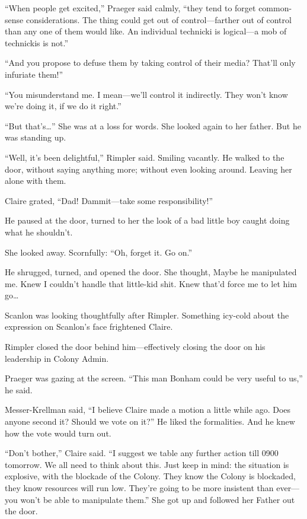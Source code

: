 ``When people get excited,'' Praeger said calmly, ``they tend to forget common-sense considerations. The thing could get out of control---farther out of control than any one of them would like. An individual technicki is logical---a mob of technickis is not.''

``And you propose to defuse them by taking control of their media? That'll only infuriate them!''

``You misunderstand me. I mean---we'll control it indirectly. They won't know we're doing it, if we do it right.''

``But that's\ldots '' She was at a loss for words. She looked again to her father. But he was standing up.

``Well, it's been delightful,'' Rimpler said. Smiling vacantly. He walked to the door, without saying anything more; without even looking around. Leaving her alone with them.

Claire grated, ``Dad! Dammit---take some responsibility!''

He paused at the door, turned to her the look of a bad little boy caught doing what he shouldn't.

She looked away. Scornfully: ``Oh, forget it. Go on.''

He shrugged, turned, and opened the door. She thought, Maybe he manipulated me. Knew I couldn't handle that little-kid shit. Knew that'd force me to let him go\ldots

Scanlon was looking thoughtfully after Rimpler. Something icy-cold about the expression on Scanlon's face frightened Claire.

Rimpler closed the door behind him---effectively closing the door on his leadership in Colony Admin.

Praeger was gazing at the screen. ``This man Bonham could be very useful to us,'' he said.

Messer-Krellman said, ``I believe Claire made a motion a little while ago. Does anyone second it? Should we vote on it?'' He liked the formalities. And he knew how the vote would turn out.

``Don't bother,'' Claire said. ``I suggest we table any further action till 0900 tomorrow. We all need to think about this. Just keep in mind: the situation is explosive, with the blockade of the Colony. They know the Colony is blockaded, they know resources will run low. They're going to be more insistent than ever---you won't be able to manipulate them.'' She got up and followed her Father out the door.

